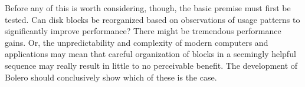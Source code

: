 \documentclass[10pt]{article}
\begin{document}
Before any of this is worth considering, though, the basic premise must first be tested. Can disk
blocks be reorganized based on observations of usage patterns to significantly improve performance?
There might be tremendous performance gains. Or, the unpredictability and complexity of modern
computers and applications may mean that careful organization of blocks in a seemingly helpful
sequence may really result in little to no perceivable benefit. The development of Bolero should conclusively
show which of these is the case.

{}

\end{document}
